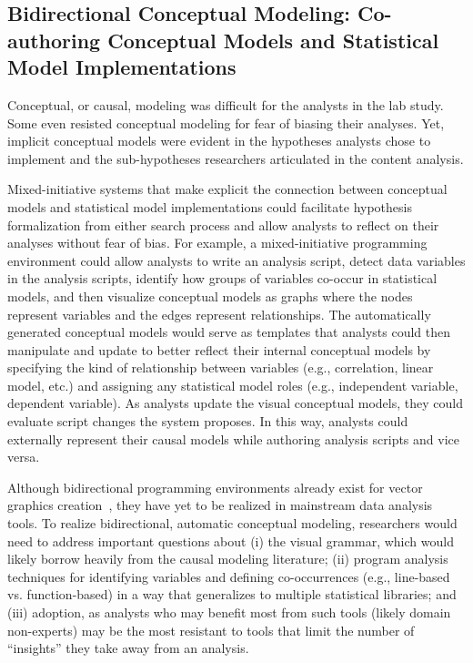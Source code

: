 \subsection*{Bidirectional Conceptual Modeling: Co-authoring Conceptual Models and Statistical Model Implementations}
Conceptual, or causal, modeling was difficult for the analysts in the lab study.
Some even resisted conceptual modeling for fear of biasing their analyses. Yet,
implicit conceptual models were evident in the hypotheses analysts chose to
implement and the sub-hypotheses researchers articulated in the content
analysis. 


Mixed-initiative systems that make explicit the connection between conceptual
models and statistical model implementations could facilitate hypothesis
formalization from either search process and allow analysts to reflect on their
analyses without fear of bias. For example, a mixed-initiative programming
environment could allow analysts to write an analysis script, detect data
variables in the analysis scripts, identify how groups of variables co-occur in
statistical models, and then visualize conceptual models as graphs where the
nodes represent variables and the edges represent relationships. The
automatically generated conceptual models would serve as templates that analysts
could then manipulate and update to better reflect their internal conceptual
models by specifying the kind of relationship between variables (e.g.,
correlation, linear model, etc.) and assigning any statistical model roles
(e.g., independent variable, dependent variable). As analysts update the visual
conceptual models, they could evaluate script changes the system proposes.
In this way, analysts could externally represent their causal models while
authoring analysis scripts and vice versa. 

Although bidirectional programming environments already exist for vector graphics
creation~\cite{hempel2019sketch}, they have yet to be realized in mainstream data analysis
tools. To realize bidirectional, automatic conceptual modeling, researchers would
need to address important questions about (i) the visual grammar, which would
likely borrow heavily from the causal modeling literature; (ii) program analysis
techniques for identifying variables and defining co-occurrences (e.g., line-based
vs. function-based) in a way that generalizes to multiple statistical libraries;
and (iii) adoption, as analysts who may benefit most from such tools (likely
domain non-experts) may be the most resistant to tools that limit the number of
``insights'' they take away from an analysis. 

